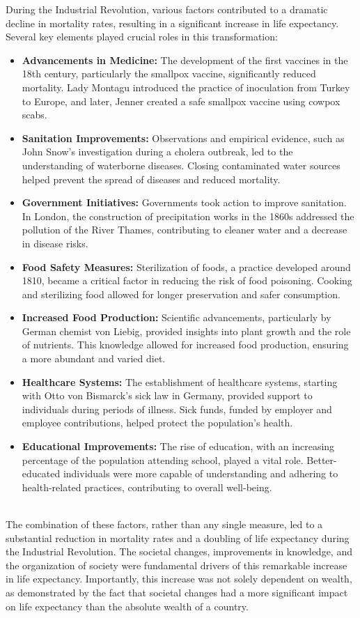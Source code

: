 \documentclass[../summary.tex]{subfiles}
\begin{document}
During the Industrial Revolution, various factors contributed to a dramatic decline in mortality rates, resulting in a significant increase in life expectancy. Several key elements played crucial roles in this transformation:
\begin{itemize}
	\item \textbf{Advancements in Medicine:} The development of the first vaccines in the 18th century, particularly the smallpox vaccine, significantly reduced mortality. Lady Montagu introduced the practice of inoculation from Turkey to Europe, and later, Jenner created a safe smallpox vaccine using cowpox scabs.
	\item \textbf{Sanitation Improvements:} Observations and empirical evidence, such as John Snow's investigation during a cholera outbreak, led to the understanding of waterborne diseases. Closing contaminated water sources helped prevent the spread of diseases and reduced mortality.
	\item \textbf{Government Initiatives:} Governments took action to improve sanitation. In London, the construction of precipitation works in the 1860s addressed the pollution of the River Thames, contributing to cleaner water and a decrease in disease risks.
	\item \textbf{Food Safety Measures:} Sterilization of foods, a practice developed around 1810, became a critical factor in reducing the risk of food poisoning. Cooking and sterilizing food allowed for longer preservation and safer consumption.
	\item \textbf{Increased Food Production:} Scientific advancements, particularly by German chemist von Liebig, provided insights into plant growth and the role of nutrients. This knowledge allowed for increased food production, ensuring a more abundant and varied diet.
	\item \textbf{Healthcare Systems:} The establishment of healthcare systems, starting with Otto von Bismarck's sick law in Germany, provided support to individuals during periods of illness. Sick funds, funded by employer and employee contributions, helped protect the population's health.
	\item \textbf{Educational Improvements:} The rise of education, with an increasing percentage of the population attending school, played a vital role. Better-educated individuals were more capable of understanding and adhering to health-related practices, contributing to overall well-being.
\end{itemize}
\ \\
The combination of these factors, rather than any single measure, led to a substantial reduction in mortality rates and a doubling of life expectancy during the Industrial Revolution. The societal changes, improvements in knowledge, and the organization of society were fundamental drivers of this remarkable increase in life expectancy. Importantly, this increase was not solely dependent on wealth, as demonstrated by the fact that societal changes had a more significant impact on life expectancy than the absolute wealth of a country.
\end{document}

